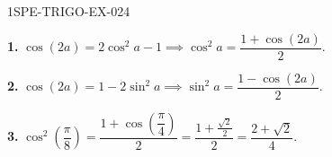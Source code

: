 \begin{corrige}{1SPE-TRIGO-EX-024}

\textbf{1.} $\cos(2a) = 2\cos^2 a - 1 \implies \cos^2 a = \dfrac{1 + \cos(2a)}{2}$.

\textbf{2.} $\cos(2a) = 1 - 2\sin^2 a \implies \sin^2 a = \dfrac{1 - \cos(2a)}{2}$.

\textbf{3.} $\cos^2\!\left(\dfrac{\pi}{8}\right) = \dfrac{1 + \cos\!\left(\dfrac{\pi}{4}\right)}{2} = \dfrac{1 + \frac{\sqrt{2}}{2}}{2} = \dfrac{2 + \sqrt{2}}{4}$.

\end{corrige}

